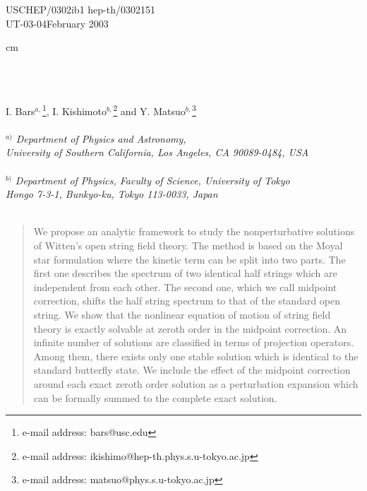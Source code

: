 \documentclass[a4paper,aps,preprint,nofootinbib,eqsecnum]{revtex4}
\begin{document}
\thispagestyle{empty}
\begin{flushleft}
USCHEP/0302ib1
\hfill hep-th/0302151 \\
UT-03-04\hfill February 2003 \\
\end{flushleft}

 cm
\bigskip

\begin{center}
 \\
 \noindent{
 }\\
\renewcommand{\thefootnote}{\fnsymbol{footnote}}

\vskip 2cm
{\large
I. Bars$^{a,}$\footnote{e-mail address: bars@usc.edu},
I. Kishimoto$^{b,}$\footnote{e-mail address:
 ikishimo@hep-th.phys.s.u-tokyo.ac.jp} and
Y. Matsuo$^{b,}$\footnote{e-mail address:
 matsuo@phys.s.u-tokyo.ac.jp} } \\
{\it
\noindent{ \bigskip }\\
$^{a)}$ Department of Physics and Astronomy,\\
University of Southern California, Los Angeles, CA 90089-0484, USA \\
\noindent{\smallskip  }\\
$^{b)}$ Department of Physics, Faculty of Science, University of Tokyo \\
Hongo 7-3-1, Bunkyo-ku, Tokyo 113-0033, Japan\\
\noindent{ \smallskip }\\
}
\bigskip
\end{center}
\begin{abstract}
We propose an analytic framework to study the nonperturbative
solutions of Witten's open string field theory.
The method is based on the Moyal star formulation
where the kinetic term can be split into two parts.
The first one describes the spectrum of two identical half strings
which are independent from each other.
The second one, which we call midpoint correction,
shifts the half string spectrum to that of
the standard open string.  We show that the nonlinear equation
of motion of string field theory is exactly solvable
at zeroth order in the midpoint correction.
An infinite number of solutions are classified in
terms of projection operators. Among them,
there exists only one stable solution which is identical to
the standard butterfly state.
We include the effect of the midpoint
correction around each exact zeroth order
solution as a perturbation expansion which can be
formally summed to the complete exact solution.
\end{abstract}
\vfill
\maketitle
 \vfill\setcounter{footnote}{0} \renewcommand{\thefootnote}{%
 \arabic{footnote}} \newpage
\end{document}
